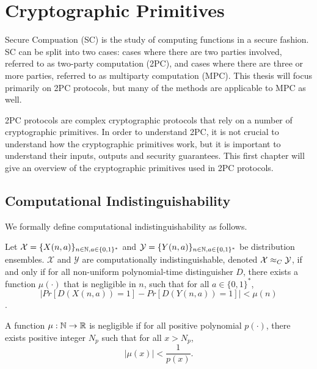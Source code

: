 \chapter{Cryptographic Primitives}
Secure Compuation (SC) is the study of computing functions in a secure fashion. 
SC can be split into two cases: cases where there are two parties involved, referred to as two-party computation (2PC), and cases where there are three or more parties, referred to as multiparty computation (MPC).
This thesis will focus primarily on 2PC protocols, but many of the methods are applicable to MPC as well.

2PC protocols are complex cryptographic protocols that rely on a number of cryptographic primitives.
In order to understand 2PC, it is not crucial to understand how the cryptographic primitives work, but it is important to understand their inputs, outputs and security guarantees. 
This first chapter will give an overview of the cryptographic primitives used in 2PC protocols.

\section{Computational Indistinguishability} 
\label{sctn:computational-indistinguishability}
We formally define computational indistinguishability as follows.

\begin{definition}
\label{defn:computational-indistinguishability}
Let $\mathcal{X} = \{X(n,a)\}_{n \in \mathbb{N}, a \in \{0,1\}^*}$ and $\mathcal{Y} = \{Y(n,a)\}_{n \in \mathbb{N}, a \in \{0,1\}^*}$ be distribution ensembles.
$\mathcal{X}$ and $\mathcal{Y}$ are computationally indistinguishable, denoted $\mathcal{X} \approx_C \mathcal{Y}$, if and only if for all non-uniform polynomial-time distinguisher $D$, there exists a function $\mu(\cdot)$ that is negligible in $n$, such that for all $a \in \{0,1\}^*$, 
\begin{equation}
    |Pr[D(X(n,a)) = 1] - Pr[D(Y(n,a)) = 1]| < \mu(n)
\end{equation}
\cite{lindell2009secure}.
\end{definition}

\begin{definition}
\label{defn:negible}
A function $\mu : \mathbb{N} \to \mathbb{R}$ is negligible if for all positive polynomial $p(\cdot)$, there exists positive integer $N_p$ such that for all $x > N_p$, 
\begin{equation}
    |\mu(x)| < \frac{1}{p(x)}.
\end{equation}
\cite{goldreich}
\end{definition}


